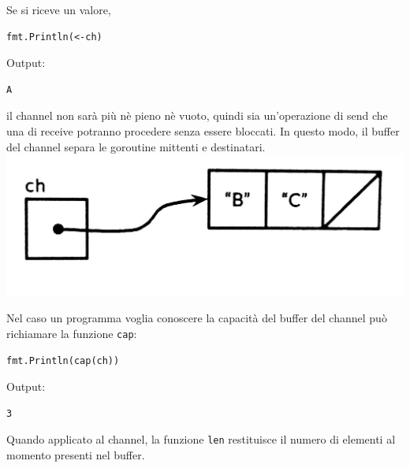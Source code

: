 \documentclass[../../../thesis.tex]{subfiles}
\begin{document}
    \noindent Se si riceve un valore,
    \begin{lstlisting}[frame = single,label={lst:lstlisting7-4-4.3}]
fmt.Println(<-ch)
    \end{lstlisting}
    Output:
    \begin{lstlisting}[language = bash, frame = L,label={lst:lstlisting7-4-4.4}]
A
    \end{lstlisting}
    il channel non sarà più nè pieno nè vuoto, quindi sia un'operazione di send che una di receive potranno procedere senza essere bloccati.
    In questo modo, il buffer del channel separa le goroutine mittenti e destinatari.
    \center
    \includegraphics[scale = 0.125]{figure-8.4}

    \justifying
    \noindent Nel caso un programma voglia conoscere la capacità del buffer del channel può richiamare la funzione \verb"cap":
    \begin{lstlisting}[frame = single,label={lst:lstlisting7-4-4.5}]
fmt.Println(cap(ch))
    \end{lstlisting}
    Output:
    \begin{lstlisting}[language = bash, frame = L,label={lst:lstlisting7-4-4.6}]
3
    \end{lstlisting}
    Quando applicato al channel, la funzione \verb"len" restituisce il numero di elementi al momento presenti nel buffer.
    \hfill \vspace{12pt}
\end{document}
